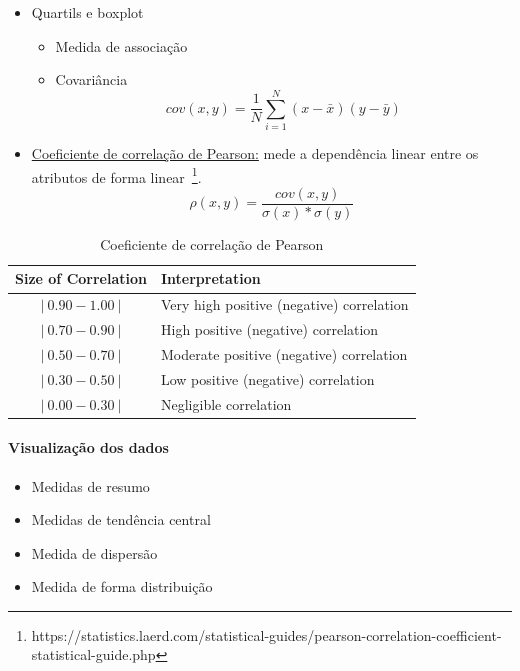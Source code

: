 \begin{itemize}
    \item Quartils e boxplot
          \begin{itemize}
              \item Medida de associação
              \item Covariância
                    \begin{equation} \label{eq:covariancia}
                        cov(x,y) = \frac{1}{N} \sum^{N}_{i=1} (x - \bar{x}) (y - \bar{y})
                    \end{equation}
          \end{itemize}
    \item \underline{Coeficiente de correlação de Pearson:}
          mede a dependência linear entre os atributos de forma linear~\footnote{https://statistics.laerd.com/statistical-guides/pearson-correlation-coefficient-statistical-guide.php}.
          \begin{equation} \label{eq:pearson}
              \rho(x,y) = \frac{cov(x,y)}{\sigma(x) * \sigma(y)}
          \end{equation}
\end{itemize}


\begin{table}
    \centering
    \caption{Coeficiente de correlação de Pearson}
    \begin{tabular}{c|l}
        \hline
        \textbf{Size of Correlation} & \textbf{Interpretation}                   \\ \hline
        $ |~0.90 - 1.00~| $          & Very high positive (negative) correlation \\ \hline
        $ |~0.70 - 0.90~| $          & High positive      (negative) correlation \\ \hline
        $ |~0.50 - 0.70~| $          & Moderate positive  (negative) correlation \\ \hline
        $ |~0.30 - 0.50~| $          & Low positive       (negative) correlation \\ \hline
        $ |~0.00 - 0.30~| $          & Negligible correlation                    \\ \hline
    \end{tabular}
    \label{tab:pearson}
\end{table}


\paragraph*{Visualização dos dados}

\begin{itemize}
    \item Medidas de resumo
    \item Medidas de tendência central
    \item Medida de dispersão
    \item Medida de forma distribuição
\end{itemize}
